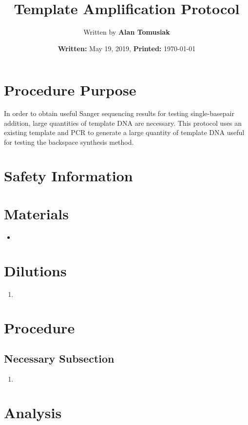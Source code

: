 \documentclass{ssiBio}
\title{Template Amplification Protocol}
\author{Written by \textbf{Alan Tomusiak}}
\date{\textbf{Written:} May 19, 2019, \textbf{Printed:} \today{}}
\begin{document}
\maketitle
\section{Procedure Purpose}
In order to obtain useful Sanger sequencing results for testing single-basepair addition, large quantities of template DNA are necessary. This protocol uses an existing template and PCR to generate a large quantity of template DNA useful for testing the backspace synthesis method. \cite{hao}

\section{Safety Information}
\begin{safety}
\begin{enumerate}
\SYBRGOLD
\end{enumerate}
\end{safety}

\section{Materials}
\begin{itemize}
\item{}
\end{itemize}

\section{Dilutions}
\begin{enumerate}
\item{}
\end{enumerate}

\section{Procedure}
\subsection{Necessary Subsection}
\begin{enumerate}
\item{}
\end{enumerate}

\section{Analysis}



\end{document}
